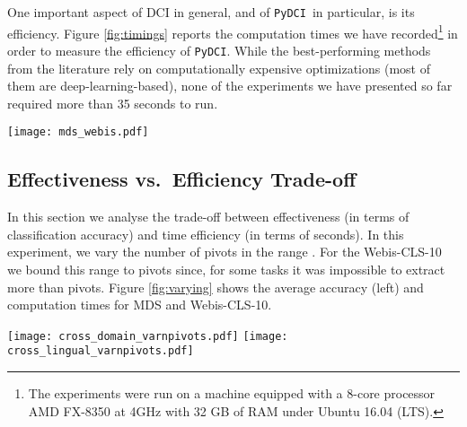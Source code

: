 \documentclass{article}
\newcommand{\pydci}{\texttt{PyDCI}}
\begin{document}
\noindent One important aspect of DCI in general, and of \pydci\ in
particular, is its efficiency. Figure \ref{fig:timings} reports the
computation times we have recorded\footnote{The experiments were run
on a machine equipped with a 8-core processor AMD FX-8350 at 4GHz with
32 GB of RAM under Ubuntu 16.04 (LTS).} in order to measure the
efficiency of \pydci.  While the best-performing methods from the
literature rely on computationally expensive optimizations (most of
them are deep-learning-based), none of the experiments we have
presented so far required more than 35 seconds to run.

\begin{figure*}[ht!]
  \centering \texttt{[image: mds\_webis.pdf]}
  \caption{Computation times for the MDS (left) and Webis-CLS-10
  (right) datasets. Values include the time required for pivot
  selection (Pivot), DCI projection (DCI), and SVM training and
  optimization (SVM). The time for preprocessing the documents is not included. Results for MDS are
  averages across 5 folds (see \citep{Blitzer:2007gf} for further
  details).}
  \label{fig:timings}
\end{figure*}



\subsection{Effectiveness vs.\ Efficiency Trade-off}
\label{sec:effvseff}

\noindent In this section we analyse the trade-off between
effectiveness (in terms of classification accuracy) and time
efficiency (in terms of seconds).  In this experiment, we vary the
number of pivots in the range
.  For the
Webis-CLS-10 we bound this range to  pivots since, for some
tasks it was impossible to extract more than  pivots.  Figure
\ref{fig:varying} shows the average accuracy (left) and computation
times for MDS and Webis-CLS-10.

\begin{figure*}[ht!]
  \centering
  \texttt{[image: cross\_domain\_varnpivots.pdf]}
  \texttt{[image: cross\_lingual\_varnpivots.pdf]}
  \caption{Effectiveness (left) and efficiency (right) of \pydci\ as a
  function of the number of pivots, for cross-domain (top) and
  cross-lingual (bottom) sentiment classification. }
  \label{fig:varying}
\end{figure*}
\end{document}

